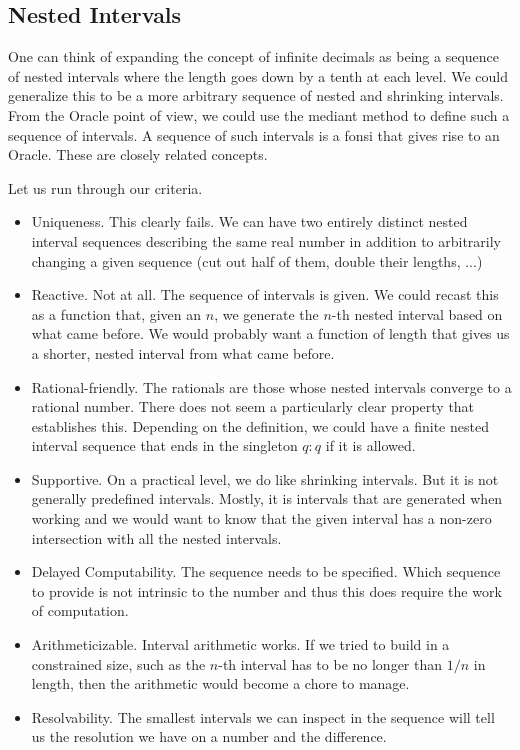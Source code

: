 \documentclass[12pt]{article}
\theoremstyle{remark}
\begin{document}
\subsection{Nested Intervals}

One can think of expanding the concept of infinite decimals as being a sequence of nested intervals where the length goes down by a tenth at each level. We could generalize this to be a more arbitrary sequence of nested and shrinking intervals. From the Oracle point of view, we could use the mediant method to define such a sequence of intervals. A sequence of such intervals is a fonsi that gives rise to an Oracle. These are closely related concepts. 

Let us run through our criteria. 

\begin{itemize}
    \item Uniqueness. This clearly fails. We can have two entirely distinct nested interval sequences describing the same real number in addition to arbitrarily changing a given sequence (cut out half of them, double their lengths, ...)
    \item Reactive. Not at all. The sequence of intervals is given. We could recast this as a function that, given an $n$, we generate the $n$-th nested interval based on what came before. We would probably want a function of length that gives us a shorter, nested interval from what came before. 
    \item Rational-friendly. The rationals are those whose nested intervals converge to a rational number. There does not seem a particularly clear property that establishes this. Depending on the definition, we could have a finite nested interval sequence that ends in the singleton $q:q$ if it is allowed. 
    \item Supportive. On a practical level, we do like shrinking intervals. But it is not generally predefined intervals. Mostly, it is intervals that are generated when working and we would want to know that the given interval has a non-zero intersection with all the nested intervals. 
    \item Delayed Computability. The sequence needs to be specified. Which sequence to provide is not intrinsic to the number and thus this does require the work of computation.  
    \item Arithmeticizable. Interval arithmetic works. If we tried to build in a constrained size, such as the $n$-th interval has to be no longer than $1/n$ in length, then the arithmetic would become a chore to manage. 
    \item Resolvability. The smallest intervals we can inspect in the sequence will tell us the resolution we have on a number and the difference. 
\end{itemize}
\end{document}
